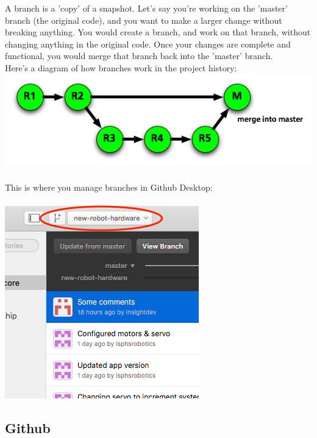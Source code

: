 \documentclass[12p,a4paper]{article}
\begin{document}
A branch is a 'copy' of a snapshot. Let's say you're working on the 'master' branch (the original code), and you want to make a larger change without breaking anything. You would create a branch, and work on that branch, without changing anything in the original code. Once your changes are complete and functional, you would merge that branch back into the 'master' branch.\\
Here's a diagram of how branches work in the project history:\\
\includegraphics[scale=0.6]{git-branches}\\ \\
This is where you manage branches in Github Desktop:\\\\
\includegraphics[scale=0.6]{github-desktop-branches}

\subsection{Github}
\end{document}
